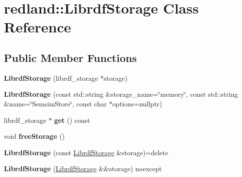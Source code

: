\hypertarget{classredland_1_1LibrdfStorage}{}\section{redland\+:\+:Librdf\+Storage Class Reference}
\label{classredland_1_1LibrdfStorage}
\subsection*{Public Member Functions}
\begin{DoxyCompactItemize}
\item 
\mbox{\label{classredland_1_1LibrdfStorage_a8e3250af4dea528dcf94865835cfb8ff}} 
{\bfseries Librdf\+Storage} (librdf\+\_\+storage $\ast$storage)
\item 
\mbox{\label{classredland_1_1LibrdfStorage_a08c025b165113efe1163c7294b989755}} 
{\bfseries Librdf\+Storage} (const std\+::string \&storage\+\_\+name=\char`\"{}memory\char`\"{}, const std\+::string \&name=\char`\"{}Semsim\+Store\char`\"{}, const char $\ast$options=nullptr)
\item 
\mbox{\label{classredland_1_1LibrdfStorage_a182d617ba7ab1b5359ef2693a56b272e}} 
librdf\+\_\+storage $\ast$ {\bfseries get} () const
\item 
\mbox{\label{classredland_1_1LibrdfStorage_a7b08e7afd5ac5f38a0ed4cfeb77a3b99}} 
void {\bfseries free\+Storage} ()
\item 
\mbox{\label{classredland_1_1LibrdfStorage_a7cef1518384fd6592ee8521cb95eb25d}} 
{\bfseries Librdf\+Storage} (const \hyperlink{classredland_1_1LibrdfStorage}{Librdf\+Storage} \&storage)=delete
\item 
\mbox{\label{classredland_1_1LibrdfStorage_a59184a87b901f1d3709d045d57311606}} 
{\bfseries Librdf\+Storage} (\hyperlink{classredland_1_1LibrdfStorage}{Librdf\+Storage} \&\&storage) noexcept
\item 
\mbox{\label{classredland_1_1LibrdfStorage_a1366716bbd3a0e41979d632c532c71ec}} 

\end{DoxyCompactItemize}
